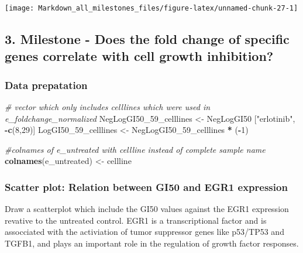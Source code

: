 \documentclass[]{article}
\newenvironment{Shaded}{\begin{snugshade}}{\end{snugshade}}
\newcommand{\CommentTok}[1]{\textcolor[rgb]{0.56,0.35,0.01}{\textit{#1}}}
\newcommand{\DecValTok}[1]{\textcolor[rgb]{0.00,0.00,0.81}{#1}}
\newcommand{\KeywordTok}[1]{\textcolor[rgb]{0.13,0.29,0.53}{\textbf{#1}}}
\newcommand{\NormalTok}[1]{#1}
\newcommand{\OperatorTok}[1]{\textcolor[rgb]{0.81,0.36,0.00}{\textbf{#1}}}
\newcommand{\StringTok}[1]{\textcolor[rgb]{0.31,0.60,0.02}{#1}}
\begin{document}
\begin{center}\texttt{[image: Markdown\_all\_milestones\_files/figure-latex/unnamed-chunk-27-1]} \end{center}

\hypertarget{milestone---does-the-fold-change-of-specific-genes-correlate-with-cell-growth-inhibition}{%
\subsection{3. Milestone - Does the fold change of specific genes
correlate with cell growth
inhibition?}\label{milestone---does-the-fold-change-of-specific-genes-correlate-with-cell-growth-inhibition}}

\hypertarget{data-prepatation}{%
\subsubsection{Data prepatation}\label{data-prepatation}}

\begin{Shaded}
\begin{Highlighting}[]
\CommentTok{# vector which only includes celllines which were used in e_foldchange_normalized}
\NormalTok{NegLogGI50_}\DecValTok{59}\NormalTok{_celllines <-}\StringTok{ }\NormalTok{NegLogGI50 [}\StringTok{"erlotinib"}\NormalTok{, }\OperatorTok{-}\KeywordTok{c}\NormalTok{(}\DecValTok{8}\NormalTok{,}\DecValTok{29}\NormalTok{)]}
\NormalTok{LogGI50_}\DecValTok{59}\NormalTok{_celllines <-}\StringTok{ }\NormalTok{NegLogGI50_}\DecValTok{59}\NormalTok{_celllines }\OperatorTok{*}\StringTok{ }\NormalTok{(}\OperatorTok{-}\DecValTok{1}\NormalTok{)}


\CommentTok{#colnames of e_untreated with cellline instead of complete sample name}
\KeywordTok{colnames}\NormalTok{(e_untreated) <-}\StringTok{ }\NormalTok{cellline}
\end{Highlighting}
\end{Shaded}

\hypertarget{scatter-plot-relation-between-gi50-and-egr1-expression}{%
\subsubsection{Scatter plot: Relation between GI50 and EGR1
expression}\label{scatter-plot-relation-between-gi50-and-egr1-expression}}

Draw a scatterplot which include the GI50 values against the EGR1
expression revative to the untreated control. EGR1 is a transcriptional
factor and is assocciated with the activiation of tumor suppressor genes
like p53/TP53 and TGFB1, and plays an important role in the regulation
of growth factor responses.
\end{document}

